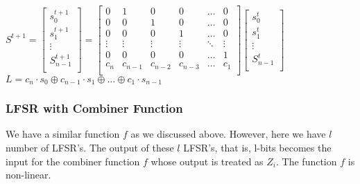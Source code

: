 \documentclass[11pt]{article}
\begin{document}
\begin{center}
    $ S^{t+1} = 
    \begin{bmatrix}
        s_0^{t+1}\\
        s_1^{t+1}\\
        \vdots\\
        S_{n-1}^{t+1}\\
    \end{bmatrix}
    =
    \begin{bmatrix}
        0 & 1 & 0 & 0 & \hdots & 0\\
        0 & 0 & 1 & 0 & \hdots & 0\\
        0 & 0 & 0 & 1 & \hdots & 0\\
        \vdots & \vdots & \vdots & \vdots & \ddots & \vdots\\
        0 & 0 & 0 & 0 & \hdots & 1\\
        c_n & c_{n-1} & c_{n-2} & c_{n-3} & \hdots & c_1\\
    \end{bmatrix}
    \begin{bmatrix}
        s_0^{t}\\
        s_1^{t}\\
        \vdots\\
        S_{n-1}^{t}\\
    \end{bmatrix}
    $\\
    \vspace{2mm}
    $L = c_n\cdot s_0 \oplus c_{n-1} \cdot s_1 \oplus \hdots \oplus c_1\cdot s_{n-1}$
\end{center}

\subsubsection*{LFSR with Combiner Function}
We have a similar function $f$ as we discussed above. However, here we have $l$ number of LFSR's. The output of these $l$ LFSR's, that is, l-bits becomes the input for the combiner function $f$ whose output is treated as $Z_i$. The function $f$ is non-linear.
\end{document}
